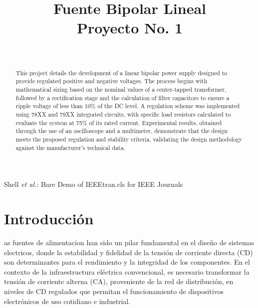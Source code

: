 \documentclass[journal]{IEEEtran}
\begin{document}
\title{Fuente Bipolar Lineal\\ \small{Proyecto No. 1}}

\author{
    \\
}
        
{Shell \MakeLowercase{\textit{et al.}}: Bare Demo of IEEEtran.cls for IEEE Journals}

\maketitle

\begin{abstract}
    This project details the development of a linear bipolar power supply designed to provide regulated positive 
    and negative voltages. The process begins with mathematical sizing based on the nominal values of a center-tapped 
    transformer, followed by a rectification stage and the calculation of filter capacitors to ensure a ripple voltage of less than 10\%
    of the DC level. A regulation scheme was implemented using 78XX and 79XX integrated circuits, with specific load resistors 
    calculated to evaluate the system at 75\% of its rated current. Experimental results, obtained through the use of an 
    oscilloscope and a multimeter, demonstrate that the design meets the proposed regulation and stability criteria, validating 
    the design methodology against the manufacturer's technical data.
\end{abstract}

\section{Introducción}

    as fuentes de alimentacion han sido un pilar fundamental en el diseño de sistemas electricos, donde la estabilidad
    y fidelidad de la tensión de corriente directa (CD) son determinantes para el rendimiento y la integridad de los componentes. 
    En el contexto de la infraestructura eléctrica convencional, es necesario transformar la tensión de corriente alterna (CA), 
    proveniente de la red de distribución, en niveles de CD regulados que permitan el funcionamiento de dispositivos electrónicos de uso cotidiano e industrial.
    
\end{document}
